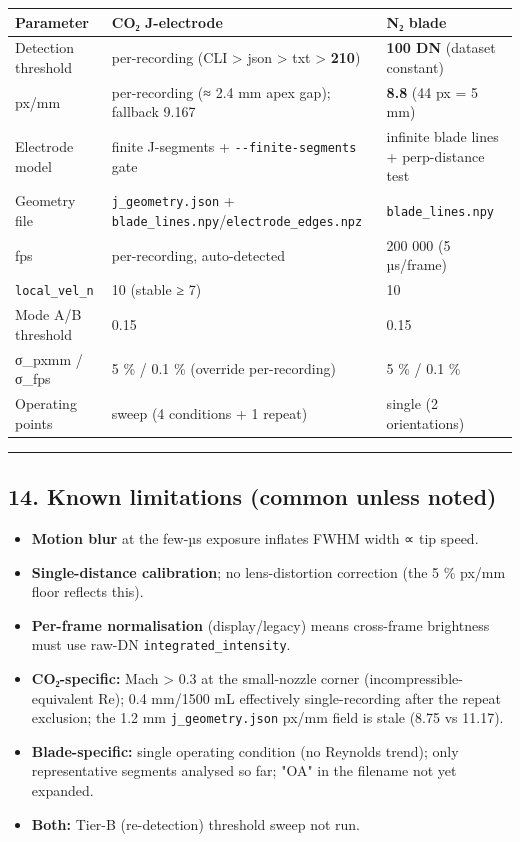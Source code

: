 \documentclass[
  11pt,
]{article}
\providecommand{\tightlist}{%
  \setlength{\itemsep}{0pt}\setlength{\parskip}{0pt}}
\begin{document}
\begin{longtable}[]{@{}lll@{}}
\toprule
Parameter & CO₂ J-electrode & N₂ blade\tabularnewline
\midrule
\endhead
Detection threshold & per-recording (CLI \textgreater{} json
\textgreater{} txt \textgreater{} \textbf{210}) & \textbf{100 DN}
(dataset constant)\tabularnewline
px/mm & per-recording (≈ 2.4 mm apex gap); fallback 9.167 & \textbf{8.8}
(44 px = 5 mm)\tabularnewline
Electrode model & finite J-segments + \texttt{-\/-finite-segments} gate
& infinite blade lines + perp-distance test\tabularnewline
Geometry file & \texttt{j\_geometry.json} +
\texttt{blade\_lines.npy}/\texttt{electrode\_edges.npz} &
\texttt{blade\_lines.npy}\tabularnewline
fps & per-recording, auto-detected & 200 000 (5 µs/frame)\tabularnewline
\texttt{local\_vel\_n} & 10 (stable ≥ 7) & 10\tabularnewline
Mode A/B threshold & 0.15 & 0.15\tabularnewline
σ\_pxmm / σ\_fps & 5 \% / 0.1 \% (override per-recording) & 5 \% / 0.1
\%\tabularnewline
Operating points & sweep (4 conditions + 1 repeat) & single (2
orientations)\tabularnewline
\bottomrule
\end{longtable}

\begin{center}\rule{0.5\linewidth}{0.5pt}\end{center}

\hypertarget{14-known-limitations-common-unless-noted}{%
\subsection{14. Known limitations (common unless
noted)}\label{14-known-limitations-common-unless-noted}}

\begin{itemize}
\tightlist
\item
  \textbf{Motion blur} at the few-µs exposure inflates FWHM width ∝ tip
  speed.
\item
  \textbf{Single-distance calibration}; no lens-distortion correction
  (the 5 \% px/mm floor reflects this).
\item
  \textbf{Per-frame normalisation} (display/legacy) means cross-frame
  brightness must use raw-DN \texttt{integrated\_intensity}.
\item
  \textbf{CO₂-specific:} Mach \textgreater{} 0.3 at the small-nozzle
  corner (incompressible- equivalent Re); 0.4 mm/1500 mL effectively
  single-recording after the repeat exclusion; the 1.2 mm
  \texttt{j\_geometry.json} px/mm field is stale (8.75 vs 11.17).
\item
  \textbf{Blade-specific:} single operating condition (no Reynolds
  trend); only representative segments analysed so far; "OA" in the
  filename not yet expanded.
\item
  \textbf{Both:} Tier-B (re-detection) threshold sweep not run.
\end{itemize}
\end{document}
